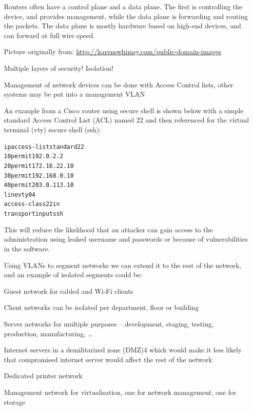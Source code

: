 \documentclass[Screen16to9,17pt]{foils}
\begin{document}


Routers often have a control plane and a data plane. The first is controlling the device, and provides
management, while the data plane is forwarding and routing the packets. The data plane is mostly hardware based on high-end devices, and can forward at full wire speed.



\centerline{Picture originally from: \url{http://karenswhimsy.com/public-domain-images}}



\centerline{\hlkbig\color{security6blue} Multiple layers of security! Isolation!}


Management of network devices can be done with Access Control lists, other systems may be put into a management VLAN

An example from a Cisco router using secure shell is shown below with a simple standard Access Control List (ACL) named 22 and then referenced for the virtual terminal (vty) secure shell (ssh):

\begin{alltt}\scriptsize
ip access-list standard 22
10 permit 192.0.2.2
20 permit 172.16.22.10
30 permit 192.168.0.10
40 permit 203.0.113.10
line vty 0 4
  access-class 22 in
  transport input ssh
\end{alltt}

This will reduce the likelihood that an attacker can gain access to the administration using leaked username and passwords or because of vulnerabilities in the software.


Using VLANs to segment networks we can extend it to the rest of the network, and an example of isolated segments could be:
\begin{list2}
\item Guest network for cabled and Wi-Fi clients
\item Client networks can be isolated per department, floor or building
\item Server networks for multiple purposes – development, staging, testing, production, manufacturing, …
\item Internet servers in a demilitarized zone (DMZ)4 which would make it less likely that compromised internet
server would affect the rest of the network
\item Dedicated printer network
\item Management network for virtualisation, one for network management, one for storage
\end{list2}
\end{document}
